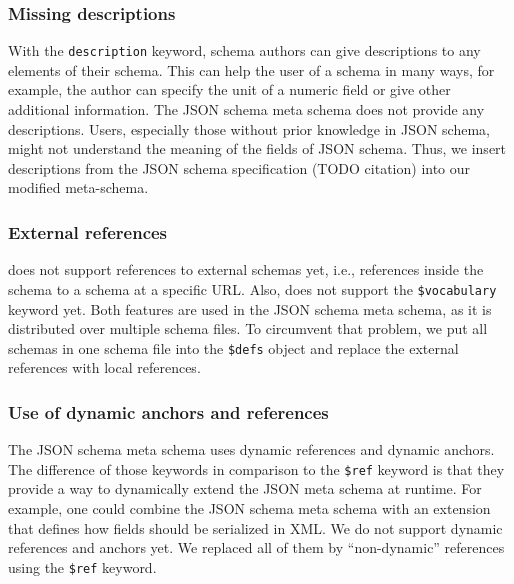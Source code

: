 \subsubsection{Missing descriptions}
With the \texttt{description} keyword, schema authors can give descriptions to any elements of their schema.
This can help the user of a schema in many ways, for example, the author can specify the unit of a numeric field or give other additional information.
The JSON schema meta schema does not provide any descriptions.
Users, especially those without prior knowledge in JSON schema, might not understand the meaning of the fields of JSON schema.
Thus, we insert descriptions from the JSON schema specification (TODO citation) into our modified meta-schema.

\subsubsection{External references}
\toolname does not support references to external schemas yet, i.e., references inside the schema to a schema at a specific URL\@.
Also, \toolname does not support the \texttt{\$vocabulary} keyword yet.
Both features are used in the JSON schema meta schema, as it is distributed over multiple schema files.
To circumvent that problem, we put all schemas in one schema file into the \texttt{\$defs} object and replace the external references with local references.

\subsubsection{Use of dynamic anchors and references}
The JSON schema meta schema uses dynamic references and dynamic anchors.
The difference of those keywords in comparison to the \texttt{\$ref} keyword is that they provide a way to dynamically extend the JSON meta schema
at runtime.
For example, one could combine the JSON schema meta schema with an extension that defines how fields should be serialized in XML\@.
We do not support dynamic references and anchors yet.
We replaced all of them by ``non-dynamic'' references using the \texttt{\$ref} keyword.

